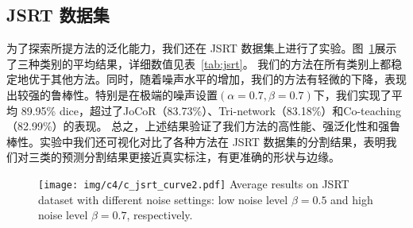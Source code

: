 \subsection{JSRT 数据集}

为了探索所提方法的泛化能力，我们还在 JSRT 数据集上进行了实验。图~\ref{fig:jsrt_curve}展示了三种类别的平均结果，详细数值见表~\ref{tab:jsrt}。
我们的方法在所有类别上都稳定地优于其他方法。同时，随着噪声水平的增加，我们的方法有轻微的下降，表现出较强的鲁棒性。特别是在极端的噪声设置$(\alpha=0.7, \beta=0.7)$下，我们实现了平均 89.95\% dice，超过了JoCoR（83.73\%）、Tri-network（83.18\%）和Co-teaching（82.99\%）的表现。
总之，上述结果验证了我们方法的高性能、强泛化性和强鲁棒性。实验中我们还可视化对比了各种方法在 JSRT 数据集的分割结果，表明我们对三类的预测分割结果更接近真实标注，有更准确的形状与边缘。

    \begin{figure}[tbh]
        \centering 
        \texttt{[image: img/c4/c\_jsrt\_curve2.pdf]}
        {Average results on JSRT dataset with different noise settings: low noise level $\beta=0.5$ and high noise level $\beta=0.7$, respectively. } %
        \label{fig:jsrt_curve}
    \end{figure}



